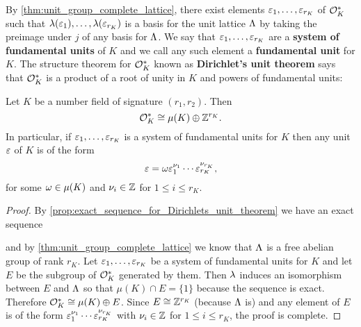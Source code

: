     By \cref{thm:unit_group_complete_lattice}, there exist elements $\varepsilon_{1},\ldots,\varepsilon_{r_{K}}$ of $\mathcal{O}_{K}^{\ast}$ such that $\lambda(\varepsilon_{1}),\ldots,\lambda(\varepsilon_{r_{K}})$ is a basis for the unit lattice $\Lambda$ by taking the preimage under $j$ of any basis for $\Lambda$. We say that $\varepsilon_{1},\ldots,\varepsilon_{r_{K}}$ are a \textbf{system of fundamental units} of $K$ and we call any such element a \textbf{fundamental unit} for $K$. The structure theorem for $\mathcal{O}_{K}^{\ast}$ known as \textbf{Dirichlet's unit theorem} says that $\mathcal{O}_{K}^{\ast}$ is a product of a root of unity in $K$ and powers of fundamental units:

    \begin{theorem*}
      Let $K$ be a number field of signature $(r_{1},r_{2})$. Then
      \[
        \mathcal{O}_{K}^{\ast} \cong \mu(K) \oplus \mathbb{Z}^{r_{K}}.
      \]
      In particular, if $\varepsilon_{1},\ldots,\varepsilon_{r_{K}}$ is a system of fundamental units for $K$ then any unit $\varepsilon$ of $K$ is of the form
      \[
        \varepsilon = \omega\varepsilon_{1}^{\nu_{1}} \cdots \varepsilon_{r_{K}}^{\nu_{r_{K}}},
      \]
      for some $\omega \in \mu(K)$ and $\nu_{i} \in \mathbb{Z}$ for $1 \le i \le r_{K}$.
    \end{theorem*}
    \begin{proof}
      By \cref{prop:exact_sequence_for_Dirichlets_unit_theorem} we have an exact sequence

      \begin{center}
      \end{center}

      and by \cref{thm:unit_group_complete_lattice} we know that $\Lambda$ is a free abelian group of rank $r_{K}$. Let $\varepsilon_{1},\ldots,\varepsilon_{r_{K}}$ be a system of fundamental units for $K$ and let $E$ be the subgroup of $\mathcal{O}_{K}^{\ast}$ generated by them. Then $\lambda$ induces an isomorphism between $E$ and $\Lambda$ so that $\mu(K) \cap E = \{1\}$ because the sequence is exact. Therefore $\mathcal{O}_{K}^{\ast} \cong \mu(K) \oplus E$. Since $E \cong \mathbb{Z}^{r_{K}}$ (because $\Lambda$ is) and any element of $E$ is of the form $\varepsilon_{1}^{\nu_{1}} \cdots \varepsilon_{r_{K}}^{\nu_{r_{K}}}$ with $\nu_{i} \in \mathbb{Z}$ for $1 \le i \le r_{K}$, the proof is complete.
    \end{proof}

